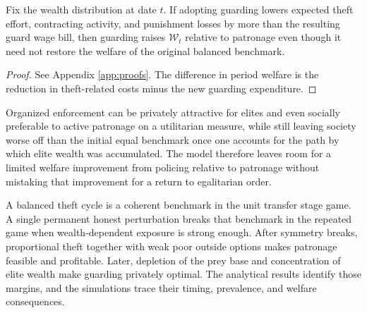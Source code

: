 \begin{corollary}
\label{cor:guard-welfare}
Fix the wealth distribution at date $t$. If adopting guarding lowers expected theft effort, contracting activity, and punishment losses by more than the resulting guard wage bill, then guarding raises $\mathcal{W}_t$ relative to patronage even though it need not restore the welfare of the original balanced benchmark.
\end{corollary}

\begin{proof}
See Appendix \ref{app:proofs}. The difference in period welfare is the reduction in theft-related costs minus the new guarding expenditure.
\end{proof}

Organized enforcement can be privately attractive for elites and even socially preferable to active patronage on a utilitarian measure, while still leaving society worse off than the initial equal benchmark once one accounts for the path by which elite wealth was accumulated. The model therefore leaves room for a limited welfare improvement from policing relative to patronage without mistaking that improvement for a return to egalitarian order.

A balanced theft cycle is a coherent benchmark in the unit transfer stage game. A single permanent honest perturbation breaks that benchmark in the repeated game when wealth-dependent exposure is strong enough. After symmetry breaks, proportional theft together with weak poor outside options makes patronage feasible and profitable. Later, depletion of the prey base and concentration of elite wealth make guarding privately optimal. The analytical results identify those margins, and the simulations trace their timing, prevalence, and welfare consequences.
